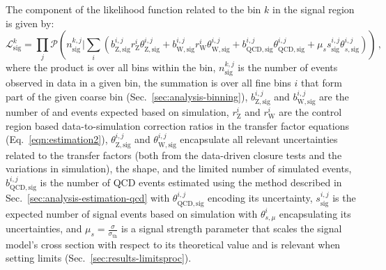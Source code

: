 The component of the likelihood function related to the \njnbht bin $k$ in the 
signal region is given by:
\begin{equation}
\mathcal{L}_\mathrm{sig}^k = \prod_{j} \mathcal{P}\left( n_\mathrm{sig}^{k,j} 
\bigg\rvert \sum_{i} (
b_\mathrm{Z,sig}^{i,j} r_{\mathrm{Z}}^i \theta_\mathrm{Z,sig}^{i,j} + 
b_\mathrm{W,sig}^{i,j} r_{\mathrm{W}}^i \theta_\mathrm{W,sig}^{i,j} + 
b_\mathrm{QCD,sig}^{i,j} \theta_\mathrm{QCD,sig}^{i,j} +
\mu_s s_\mathrm{sig}^{i,j} \theta_{s,\mathrm{sig}}^{i,j}
) \right) \, ,
\end{equation}
where the product is over all \mht bins within the \njnbht bin, 
$n_\mathrm{sig}^{k,j}$ is the number of events observed in data in a given 
\njnbhtmht  
bin, the summation is over all fine \njnbht bins $i$ that form part of the 
given coarse \scalht bin (Sec.~\ref{sec:analysis-binning}), 
$b_\mathrm{Z,sig}^{i,j}$ 
and $b_\mathrm{W,sig}^{i,j}$ are the number of \znnj and \ttw events expected 
based on simulation, $r_{\mathrm{Z}}^i$ and $r_{\mathrm{W}}^i$ are the control 
region based
data-to-simulation correction ratios in the transfer factor equations 
(Eq.~\ref{eqn:estimation2}), $\theta_\mathrm{Z,sig}^{i,j}$ and 
$\theta_\mathrm{W,sig}^{i,j}$ encapsulate all relevant 
uncertainties related to the transfer factors (both from the data-driven 
closure tests and the variations in simulation), the \mht shape, and the 
limited number of 
simulated events, $b_\mathrm{QCD,sig}^{i,j}$ is the number of QCD events 
estimated using the method described in Sec.~\ref{sec:analysis-estimation-qcd} 
with $\theta_\mathrm{QCD,sig}^{i,j}$ encoding its uncertainty, 
$s_\mathrm{sig}^{i,j}$ is the expected number of signal 
events based on simulation with $\theta_{s,\mu}^i$ encapsulating its 
uncertainties, 
and $\mu_s=\frac{\sigma}{\sigma_{\mathrm{th}}}$ is a signal strength parameter 
that scales the signal model's cross section with respect to its theoretical 
value and is relevant when setting limits (Sec.~\ref{sec:results-limitsproc}).

